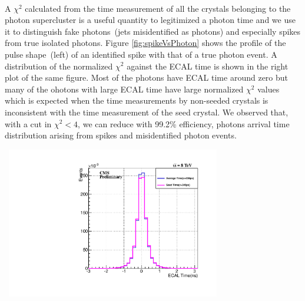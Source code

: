 \paragraph*{}
  A $\chi^{2}$ calculated from the time measurement of all the crystals belonging to the photon supercluster is a useful quantity to legitimized a photon time and we use it to distinguish fake photons~(jets misidentified as photons) and especially spikes from true isolated photons. Figure  \ref{fig:spikeVsPhoton} shows the profile of the pulse shape~(left) of an identified spike with that of a true photon event. A distribution of the normalized $\chi^{2}$ against the ECAL time is shown in the right plot of the same figure. Most of the photons have ECAL time around zero but many of the ohotons with large ECAL time  have large normalized $\chi^{2}$ values which is expected when the time measurements by non-seeded crystals is inconsistent with the time measurement of the seed crystal. We observed that, with a cut in $\chi^{2} < 4$, we can reduce with 99.2\% efficiency, photons arrival time distribution arising from spikes and misidentified photon events.
\newline
\begin{minipage}{0.90\linewidth} 
\begin{center}
\mbox{
\includegraphics[height=0.50\textwidth, width=0.7\textwidth]{THESISPLOTS/ECAL-SeedVsAveTime-Zee.pdf}
}
\label{fig:TIME}
\end{center}
\end{minipage}


